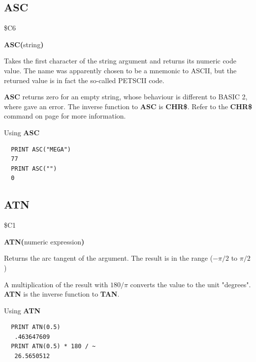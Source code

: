 \subsection{ASC}
\begin{description}[leftmargin=2cm,style=nextline]
\item [Token:] \$C6
\item [Format:] {\bf ASC(}string{\bf)}
\item [Usage:] Takes the first character of
               the string argument and returns its numeric code value.
               The name was apparently chosen to be a mnemonic to ASCII,
               but the returned value is in fact the so-called PETSCII code.
\item [Remarks:]
               {\bf ASC} returns zero for an empty string, whose behaviour
               is different to BASIC 2, where  gave an error.
               The inverse function to {\bf ASC} is {\bf CHR\$}.
               Refer to the {\bf CHR\$} command on page \pageref{chrcommand}
               for more information.

\item [Examples:] Using {\bf ASC}
\begin{tcolorbox}[colback=black,coltext=white]
\verbatimfont{\codefont}
\begin{verbatim}
  PRINT ASC("MEGA")
  77
  PRINT ASC("")
  0
\end{verbatim}
\end{tcolorbox}
\end{description}


\newpage
\subsection{ATN}
\begin{description}[leftmargin=2cm,style=nextline]
\item [Token:] \$C1
\item [Format:] {\bf ATN(}numeric expression{\bf)}
\item [Usage:] Returns the arc tangent of the argument.
               The result is in the range ($-\pi/2$ to $\pi/2$)

\item [Remarks:]
               A multiplication of the result with $180/\pi$
               converts the value to the unit "degrees".
               {\bf ATN} is the inverse function to {\bf TAN}.
\item [Examples:] Using {\bf ATN}
\begin{tcolorbox}[colback=black,coltext=white]
\verbatimfont{\codefont}
\begin{verbatim}
  PRINT ATN(0.5)
   .463647609
  PRINT ATN(0.5) * 180 / ~
   26.5650512
\end{verbatim}
\end{tcolorbox}
\end{description}

